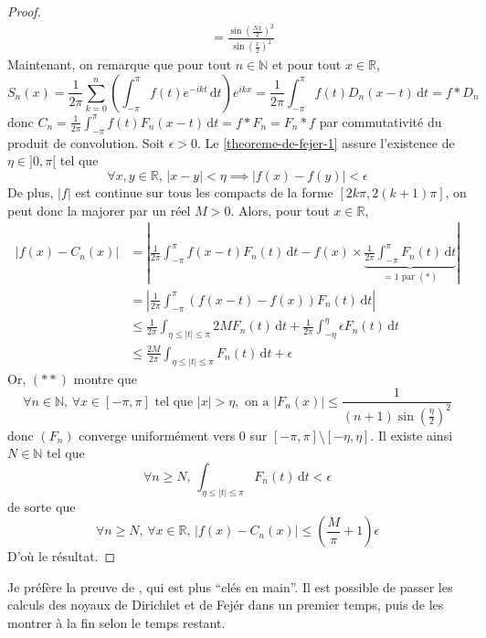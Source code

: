 \begin{proof}
\begin{align*}
      &=\frac{\sin \left( \frac{Nx}{2} \right)^2}{\sin \left ( \frac{x}{2} \right)^2} \tag{$**$}
    \end{align*}
    Maintenant, on remarque que pour tout $n \in \mathbb{N}$ et pour tout $x \in \mathbb{R}$,
    \[ S_n(x) = \frac{1}{2\pi} \sum_{k=0}^n \left( \int_{-\pi}^{\pi} f(t) e^{-ikt} \, \mathrm{d}t \right) e^{ikx} = \frac{1}{2\pi} \int_{-\pi}^{\pi} f(t) D_n(x-t) \, \mathrm{d}t = f * D_n \]
    donc $C_n = \frac{1}{2\pi} \int_{-\pi}^{\pi} f(t) F_n(x-t) \, \mathrm{d}t = f * F_n = F_n * f$ par commutativité du produit de convolution. Soit $\epsilon > 0$. Le \cref{theoreme-de-fejer-1} assure l'existence de $\eta \in ]0, \pi[$ tel que
    \[ \forall x, y \in \mathbb{R}, \, \vert x - y \vert < \eta \implies \vert f(x) - f(y) \vert < \epsilon \]
    De plus, $\vert f \vert$ est continue sur tous les compacts de la forme $[2k\pi, 2(k+1)\pi]$, on peut donc la majorer par un réel $M > 0$. Alors, pour tout $x \in \mathbb{R}$,
    \begin{align*}
      \vert f(x) - C_n(x) \vert &= \left\vert \frac{1}{2\pi} \int_{-\pi}^{\pi} f(x-t) F_n(t) \, \mathrm{d}t - f(x) \times \underbrace{\frac{1}{2\pi} \int_{-\pi}^{\pi} F_n(t) \, \mathrm{d}t}_{= 1 \text{ par } (*)} \right\vert \\
      &= \left\vert \frac{1}{2\pi} \int_{-\pi}^{\pi} (f(x-t) - f(x)) F_n(t) \, \mathrm{d}t \right\vert \\
      &\leq \frac{1}{2\pi} \int_{\eta \leq \vert t \vert \leq \pi} 2MF_n(t) \, \mathrm{d}t + \frac{1}{2\pi} \int_{-\eta}^{\eta} \epsilon F_n(t) \, \mathrm{d}t \\
      &\leq \frac{2M}{2\pi} \int_{\eta \leq \vert t \vert \leq \pi} F_n(t) \, \mathrm{d}t + \epsilon
    \end{align*}
    Or, $(**)$ montre que
    \[ \forall n \in \mathbb{N}, \, \forall x \in [-\pi, \pi] \text{ tel que } \vert x \vert > \eta, \text{ on a } \vert F_n(x) \vert \leq \frac{1}{(n+1) \sin\left( \frac{\eta}{2} \right)^2} \]
    donc $(F_n)$ converge uniformément vers $0$ sur $[-\pi, \pi] \setminus [-\eta, \eta]$. Il existe ainsi $N \in \mathbb{N}$ tel que
    \[ \forall n \geq N, \, \int_{\eta \leq \vert t \vert \leq \pi} F_n(t) \, \mathrm{d}t < \epsilon \]
    de sorte que
    \[ \forall n \geq N, \, \forall x \in \mathbb{R}, \, \vert f(x) - C_n(x) \vert \leq \left(\frac{M}{\pi} + 1\right) \epsilon \]
    D'où le résultat.
  \end{proof}

  \begin{remark}
    Je préfère la preuve de \cite{[GOU21]}, qui est plus ``clés en main''. Il est possible de passer les calculs des noyaux de Dirichlet et de Fejér dans un premier temps, puis de les montrer à la fin selon le temps restant.
  \end{remark}

